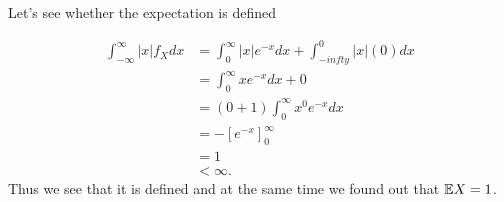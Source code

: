 
Let's see whether the expectation is defined

\begin{align*}
    \int_{-\infty}^{\infty} |x| f_{X} dx &= \int_{0}^{\infty} |x| e^{-x} dx + \int_{-infty}^{0} |x|
    (0) dx \\
					 &= \int_{0}^{\infty}x e^{-x} dx + 0\\
					 &= (0+1) \int_{0}^{\infty} x^{0} e^{-x} dx\\
					 &= -\left[ e^{-x}  \right]_{0}^{\infty} \\
					 &= 1\\
					 &< \infty.
\end{align*}
Thus we see that it is defined and at the same time we found out that $ \mathbb{E} X = 1$. 
